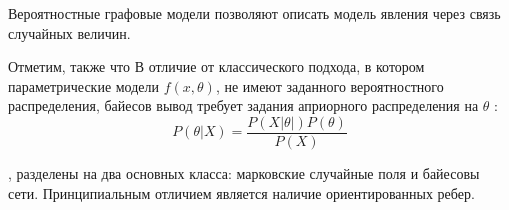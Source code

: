 Вероятностные графовые модели позволяют описать модель явления через
связь случайных величин.





Отметим, также что В отличие от классического подхода, в котором
параметрические модели $f(x,\theta)$, не имеют заданного
вероятностного распределения, байесов вывод
требует задания априорного распределения на $\theta$ :
\begin{equation}
    P(\theta | X) = \frac{P(X| \theta|) P(\theta)}{P(X)}
\end{equation}





, разделены на два основных класса: марковские случайные поля и байесовы сети.
Принципиальным отличием является наличие ориентированных ребер.








